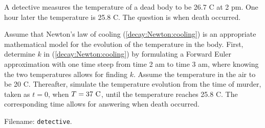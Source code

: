 \documentclass[graybox,sectrefs,envcountresetchap,open=right,final]{svmonodo}
\makeatletter
\newenvironment{doconceexercise}{}{}
\newcounter{doconceexercisecounter}%
\newcommand\listofexercises{
\chapter*{List of Exercises, Problems, and Projects
          \@mkboth{List of Exercises, Problems, and Projects}{List of Exercises, Problems, and Projects}}
\markboth{List of Exercises, Problems, and Projects}{List of Exercises, Problems, and Projects}
\@starttoc{loe}
}
\makeatother
\begin{document}
\begin{doconceexercise}

                
\label{decay:app:exer:cooling:murder}


A detective measures the temperature of a dead body to be 26.7 C at 2
pm. One hour later the temperature is 25.8 C. The question is when
death occurred.

Assume that Newton's law of cooling (\ref{decay:Newton:cooling}) is an
appropriate mathematical model for the evolution of the temperature in
the body.  First, determine $k$ in (\ref{decay:Newton:cooling}) by
formulating a Forward Euler approximation with one time steep from
time 2 am to time 3 am, where knowing the two temperatures allows for
finding $k$. Assume the temperature in the air to be 20 C. Thereafter,
simulate the temperature evolution from the time of murder, taken as
$t=0$, when $T=37\hbox{ C}$, until the temperature reaches 25.8 C. The
corresponding time allows for answering when death occurred.

\noindent Filename: \texttt{detective}.

\end{doconceexercise}
\end{document}
